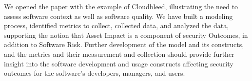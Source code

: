 We opened the paper with the example of Cloudbleed, illustrating the need to assess software context as well as software quality. We have built a modeling process, identified metrics to collect, collected data, and analyzed the data, supporting the notion that Asset Impact is a component of security Outcomes, in addition to Software Risk. Further development of the model and its constructs, and the metrics and their measurement and collection should provide further insight into the software development and usage constructs affecting security outcomes for the software's developers, managers, and users.